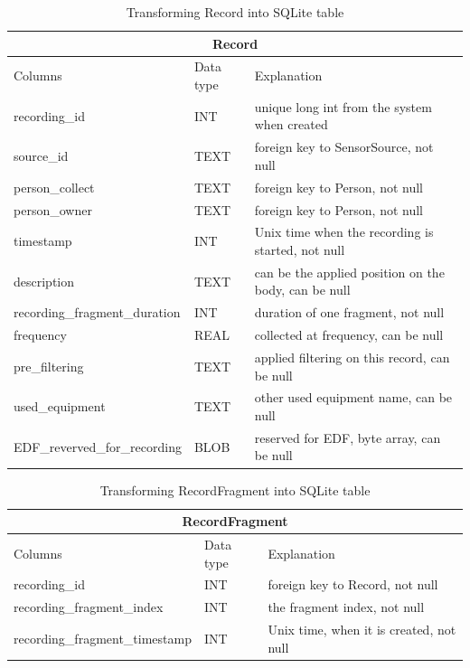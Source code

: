 \begin{table}
\begin{center}
\begin{tabular}{ |p{4cm}|p{1.8cm}|p{6.2cm}|  }
 \hline
 \multicolumn{3}{|c|}{Record} \\
 \hline
 Columns& Data type & Explanation \\
 \hline
 recording\_id& INT& unique long int from the system when created\\
 source\_id& TEXT& foreign key to SensorSource, not null\\
 person\_collect& TEXT& foreign key to Person, not null\\
 person\_owner& TEXT& foreign key to Person, not null\\
 timestamp& INT& Unix time when the recording is started, not null\\
 description& TEXT& can be the applied position on the body, can be null\\
 recording\_fragment\_duration& INT& duration of one fragment, not null\\
 frequency& REAL& collected at frequency, can be null\\
 pre\_filtering& TEXT& applied filtering on this record, can be null\\
 used\_equipment& TEXT& other used equipment name, can be null\\
 EDF\_reverved\_for\_recording& BLOB& reserved for EDF, byte array, can be null\\
 \hline
\end{tabular}
\end{center}
\caption{Transforming Record into SQLite table}
\label{tab:RecordTypeSQL}
\end{table}
\begin{table}
\begin{center}
\begin{tabular}{ |p{4cm}|p{1.8cm}|p{6.2cm}|  }
 \hline
 \multicolumn{3}{|c|}{RecordFragment} \\
 \hline
 Columns& Data type & Explanation \\
 \hline
 recording\_id& INT& foreign key to Record, not null\\
 recording\_fragment\_index& INT& the fragment index, not null\\
 recording\_fragment\_timestamp& INT& Unix time, when it is created, not null\\
 \hline
\end{tabular}
\end{center}
\caption{Transforming RecordFragment into SQLite table}
\label{tab:RecordFragmentTypeSQL}
\end{table}
